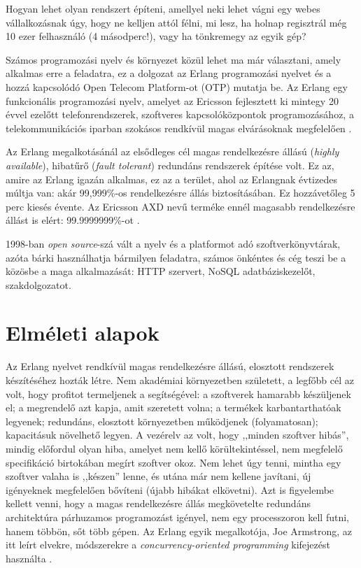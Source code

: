\documentclass[12pt, a4paper, oneside]{book}
\begin{document}
Hogyan lehet olyan rendszert építeni, amellyel neki lehet vágni egy webes
vállalkozásnak úgy, hogy ne kelljen attól félni, mi lesz, ha holnap regisztrál
még 10 ezer felhasználó (4 másodperc!), vagy ha tönkremegy az egyik gép?

Számos programozási nyelv és környezet közül lehet ma már választani, amely
alkalmas erre a feladatra, ez a dolgozat az Erlang programozási nyelvet és a
hozzá kapcsolódó Open Telecom Platform-ot (OTP) mutatja be. Az Erlang egy
funkcionális programozási nyelv, amelyet az Ericsson fejlesztett ki mintegy 20
évvel ezelőtt telefonrendszerek, szoftveres kapcsolóközpontok programozásához,
a telekommunikációs iparban szokásos rendkívül magas elvárásoknak megfelelően
\citep{ArmstrongBook}. 

Az Erlang megalkotásánál az elsődleges cél magas rendelkezésre állású
(\emph{highly available}), hibatűrő (\emph{fault tolerant}) redundáns
rendszerek építése volt. Ez az, amire az Erlang igazán alkalmas, ez az a
terület, ahol az Erlangnak évtizedes múltja van: akár 99,999\%-os
rendelkezésre állás biztosításában. Ez hozzávetőleg 5 perc kiesés
évente. Az Ericsson AXD nevű terméke ennél magasabb rendelkezésre állást is
elért: 99.9999999\%-ot \citep{CesariniBook}.

1998-ban \emph{open source}-szá vált a nyelv és a platformot adó
szoftverkönyvtárak, azóta bárki használhatja bármilyen feladatra, számos
önkéntes és cég teszi be a közösbe a maga alkalmazását: HTTP szervert, NoSQL
adatbáziskezelőt, szakdolgozatot.

\newpage

\chapter{Elméleti alapok} 

Az Erlang nyelvet rendkívül magas rendelkezésre állású, elosztott rendszerek
készítéséhez hozták létre. Nem akadémiai környezetben született, a legfőbb cél
az volt, hogy profitot termeljenek a segítségével: a szoftverek hamarabb
készüljenek el; a megrendelő azt kapja, amit szeretett volna; a termékek
karbantarthatóak legyenek; redundáns, elosztott környezetben működjenek
(folyamatosan); kapacitásuk növelhető legyen. A vezérelv az volt, hogy ,,minden
szoftver hibás'', mindig előfordul olyan hiba, amelyet nem kellő
körültekintéssel, nem megfelelő specifikáció birtokában megírt szoftver okoz.
Nem lehet úgy tenni, mintha egy szoftver valaha is ,,készen'' lenne, és utána már
nem kellene javítani, új igényeknek megfelelően bővíteni (újabb hibákat
elkövetni). Azt is figyelembe kellett venni, hogy a magas
rendelkezésre állás megkövetelte redundáns architektúra párhuzamos programozást
igényel, nem egy processzoron kell futni, hanem többön, sőt több gépen. Az
Erlang egyik megalkotója, Joe Armstrong, az itt leírt elvekre, módszerekre a
\emph{concurrency-oriented programming} kifejezést használta
\citep{ArmstrongBook}.
\end{document}
